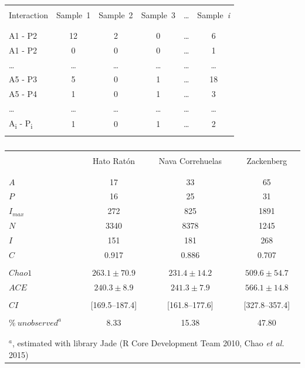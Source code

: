 \documentclass[12pt]{article}
\begin{document}
%
\newpage
\begin{table}[ht!]
  \caption{}
  \label{Table_3}
  \begin{center}
    \begin{tabular}{lccccc}
      \hline
\\Interaction&Sample\ 1&Sample\ 2&Sample\ 3&{\ldots}&Sample\ \emph{i}\\\\
      \hline
\\A1 - P2&12&2&0&{\ldots}&6\\
A1 - P2&0&0&0&{\ldots}&1\\
{\ldots}&{\ldots}&{\ldots}&{\ldots}&{\ldots}&{\ldots}\\
A5 - P3&5&0&1&{\ldots}&18\\
A5 - P4&1&0&1&{\ldots}&3\\
{\ldots}&{\ldots}&{\ldots}&{\ldots}&{\ldots}&{\ldots}\\
A\textsubscript{i} - P\textsubscript{i}&1&0&1&{\ldots}&2\\\\
      \hline
    \end{tabular}
  \end{center}
\end{table}
%
\newpage
\begin{table}[ht!]
  \caption{}
  \label{Table_4}
  \begin{center}
    \begin{tabular}{lccc}
      \hline
\\       &Hato Rat\'on  &  Nava Correhuelas&    Zackenberg\\\\
      \hline             
\\$A$&17&33&65\\
$P$&16&25&31\\
$I_{max}$&272&825&1891\\
$N$&3340&8378&1245\\
$I$&151&181&268\\
$C$&0.917&0.886&0.707\\\\
$Chao1$&$263.1\pm70.9$&$231.4\pm14.2$&$509.6\pm54.7$\\
$ACE$&$240.3\pm8.9$&$241.3\pm7.9$&$566.1\pm14.8$\\\\
$CI$&[169.5--187.4]&[161.8--177.6]&[327.8--357.4]\\\\
$\%\ unobserved^a$&8.33&15.38&47.80\\\\
      \hline
\\\multicolumn{4}{l}{$^a$, estimated with library Jade (R Core Development Team 2010, Chao \emph{et al.} 2015)}\\
    \end{tabular}
  \end{center}
\end{table}
\end{document}
